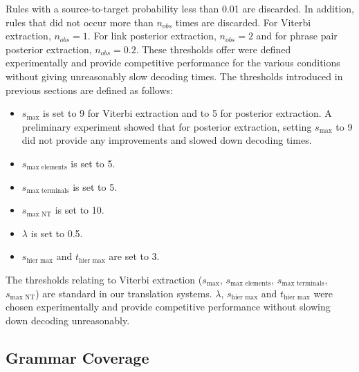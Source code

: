 Rules with a source-to-target probability less than 0.01 are discarded. In
addition, rules that did not occur more than $n_{obs}$ times are discarded. For
Viterbi extraction, $n_{obs} = 1$. For link posterior extraction, $n_{obs} = 2$
and for phrase pair posterior extraction, $n_{obs} = 0.2$. These thresholds
offer were defined experimentally and provide competitive performance for the various
conditions without giving unreasonably slow decoding times.
The thresholds introduced in previous sections are defined as follows:
%
\begin{itemize}
  \item $s_{\text{max}}$ is set to 9 for Viterbi extraction and to 5 for
posterior extraction. A preliminary experiment showed that for posterior
extraction, setting $s_{\text{max}}$ to 9 did not provide any improvements
and slowed down decoding times.
  \item $s_{\text{max elements}}$ is set to 5.
  \item $s_{\text{max terminals}}$ is set to 5.
  \item $s_{\text{max NT}}$ is set to 10.
  \item $\lambda$ is set to 0.5.
  \item $s_{\text{hier max}}$ and $t_{\text{hier max}}$ are set to 3.
\end{itemize}
%
The thresholds relating to Viterbi extraction ($s_{\text{max}}$,
$s_{\text{max elements}}$, $s_{\text{max terminals}}$, $s_{\text{max NT}}$) are standard in our
translation systems. $\lambda$, $s_{\text{hier max}}$ and $t_{\text{hier max}}$
were chosen experimentally and provide competitive performance without slowing down decoding
unreasonably.

\subsection{Grammar Coverage}
\label{sec:grammarcoverage}

